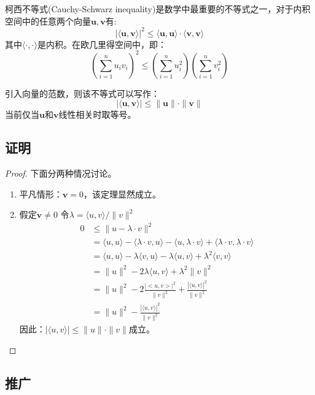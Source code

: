 \documentclass[a4paper]{article} %
\numberwithin{equation}{section} %
\begin{document}
柯西不等式(Cauchy-Schwarz inequality)是数学中最重要的不等式之一，对于内积空间中的任意两个向量$\mathbf u,\mathbf v$有:
\begin{equation}
|\langle \mathbf u,\mathbf v\rangle|^2\le \langle \mathbf u,\mathbf u\rangle \cdot\langle \mathbf v,\mathbf v\rangle
\end{equation}
其中$\langle\cdot,\cdot\rangle$是内积。在欧几里得空间中，即：
\begin{equation}
\left(\sum _{i=1}^{n}u_{i}v_{i}\right)^{2}\leq \left(\sum _{i=1}^{n}u_{i}^{2}\right)\left(\sum _{i=1}^{n}v_{i}^{2}\right)
\end{equation}


引入向量的范数，则该不等式可以写作：
\begin{equation}
|\langle\mathbf u,\mathbf v\rangle|\le \|\mathbf u\|\cdot\|\mathbf v\|
\end{equation}
当前仅当$\mathbf u$和$\mathbf v$线性相关时取等号。

\subsection{证明}

\begin{proof}
下面分两种情况讨论。

\begin{enumerate}[1$^\circ$]
\item 平凡情形：$\mathbf v=0$，该定理显然成立。
\item 假定$\mathbf v\neq 0$ 令$\lambda=\langle u,v\rangle/\|v\|^2$
\begin{align}
0 &\le \|u-\lambda\cdot v\|^2 \\
&=\langle u,u\rangle-\langle\lambda\cdot v,u\rangle-\langle u,\lambda\cdot v\rangle+\langle\lambda\cdot v,\lambda\cdot v\rangle \\
&=\langle u,u\rangle-\lambda\langle v,u\rangle-\lambda\langle u,v \rangle+\lambda^2\langle v,v\rangle \\
&=\|u\|^2-2\lambda\langle u,v\rangle+\lambda^2\|v\|^2 \\
&=\|u\|^2-2\frac{|<u,v>|^2}{\|v\|^2}+\frac{|\langle u,v\rangle|^2}{\|v\|^2} \\
&=\|u\|^2-\frac{|\langle u,v\rangle|^2}{\|v\|^2}
\end{align}
因此：$|\langle u,v\rangle |\le \|u\|\cdot\|v\|$成立。
\end{enumerate}
\end{proof}

\subsection{推广}
\end{document}
